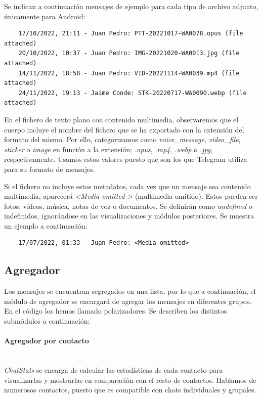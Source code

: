 Se indican a continuación mensajes de ejemplo para cada tipo de archivo adjunto, únicamente para Android:

\begin{lstlisting}
	17/10/2022, 21:11 - Juan Pedro: PTT-20221017-WA0078.opus (file attached)
	20/10/2022, 10:37 - Juan Pedro: IMG-20221020-WA0013.jpg (file attached)
	14/11/2022, 18:58 - Juan Pedro: VID-20221114-WA0039.mp4 (file attached)
	24/11/2022, 19:13 - Jaime Conde: STK-20220717-WA0090.webp (file attached)
\end{lstlisting}

En el fichero de texto plano con contenido multimedia, observaremos que el cuerpo incluye el nombre del fichero que se ha exportado con la extensión del formato del mismo. Por ello, categorizamos como \textit{voice\_message}, \textit{video\_file}, \textit{sticker} o \textit{image} en función a la extensión; \textit{.opus}, \textit{.mp4}, \textit{.webp} o \textit{.jpg}, respectivamente. Usamos estos valores puesto que son los que Telegram utiliza para su formato de mensajes.

Si el fichero no incluye estos metadatos, cada vez que un mensaje sea contenido multimedia, aparecerá \textit{\textless Media omitted \textgreater} (multimedia omitido). Estos pueden ser fotos, vídeos, música, notas de voz o documentos. Se definirán como \textit{undefined} o indefinidos, ignorándose en las visualizaciones y módulos posteriores. Se muestra un ejemplo a continuación:

\begin{lstlisting}
	17/07/2022, 01:33 - Juan Pedro: <Media omitted>
\end{lstlisting}

\subsection{Agregador}

Los mensajes se encuentran segregados en una lista, por lo que a continuación, el módulo de agregador se encargará de agregar los mensajes en diferentes grupos. En el código los hemos llamado polarizadores. Se describen los distintos submódulos a continuación:

\paragraph{Agregador por contacto}\mbox{}\\

\textit{ChatStats} se encarga de calcular las estadísticas de cada contacto para visualizarlas y mostrarlas en comparación con el resto de contactos. Hablamos de numerosos contactos, puesto que es compatible con chats individuales y grupales.

